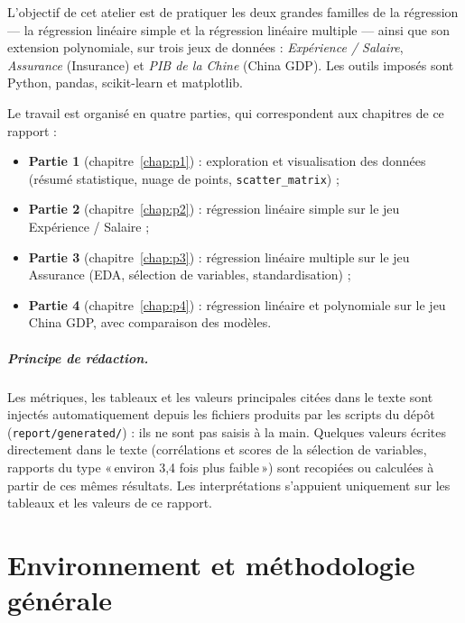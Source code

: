 \documentclass[11pt,a4paper]{report}
\begin{document}
L'objectif de cet atelier est de pratiquer les deux grandes familles de la
r\'egression --- la r\'egression lin\'eaire simple et la r\'egression lin\'eaire
multiple --- ainsi que son extension polynomiale, sur trois jeux de donn\'ees :
\emph{Exp\'erience / Salaire}, \emph{Assurance} (Insurance) et \emph{PIB de la Chine}
(China GDP). Les outils impos\'es sont Python, pandas, scikit-learn et matplotlib.

Le travail est organis\'e en quatre parties, qui correspondent aux chapitres de ce
rapport :
\begin{itemize}
  \item \textbf{Partie 1} (chapitre~\ref{chap:p1}) : exploration et visualisation des donn\'ees
        (r\'esum\'e statistique, nuage de points, \texttt{scatter\_matrix}) ;
  \item \textbf{Partie 2} (chapitre~\ref{chap:p2}) : r\'egression lin\'eaire simple sur le
        jeu Exp\'erience / Salaire ;
  \item \textbf{Partie 3} (chapitre~\ref{chap:p3}) : r\'egression lin\'eaire multiple sur le
        jeu Assurance (EDA, s\'election de variables, standardisation) ;
  \item \textbf{Partie 4} (chapitre~\ref{chap:p4}) : r\'egression lin\'eaire et polynomiale sur
        le jeu China GDP, avec comparaison des mod\`eles.
\end{itemize}

\paragraph{Principe de rédaction.} Les métriques, les tableaux et les valeurs principales citées dans le texte sont injectés automatiquement depuis les fichiers produits par les scripts du dépôt (\texttt{report/generated/}) : ils ne sont pas saisis à la main. Quelques valeurs écrites directement dans le texte (corrélations et scores de la sélection de variables, rapports du type «\,environ 3,4 fois plus faible\,») sont recopiées ou calculées à partir de ces mêmes résultats. Les interprétations s'appuient uniquement sur les tableaux et les valeurs de ce rapport.

\chapter{Environnement et m\'ethodologie g\'en\'erale}
\label{chap:env}
\end{document}
